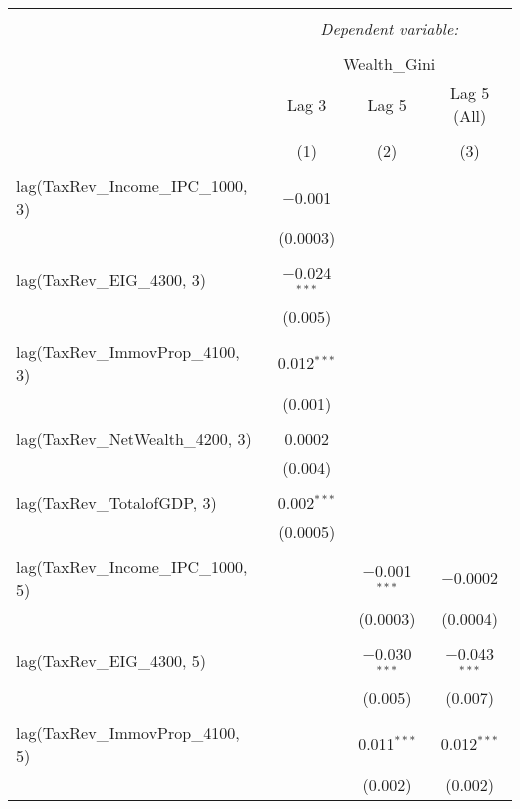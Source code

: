 
\begin{table}[!htbp] \centering 
  \caption{} 
  \label{} 
\begin{tabular}{@{\extracolsep{5pt}}lccc} 
\\[-1.8ex]\hline 
\hline \\[-1.8ex] 
 & \multicolumn{3}{c}{\textit{Dependent variable:}} \\ 
\cline{2-4} 
\\[-1.8ex] & \multicolumn{3}{c}{Wealth\_Gini} \\ 
 & Lag 3 & Lag 5 & Lag 5 (All) \\ 
\\[-1.8ex] & (1) & (2) & (3)\\ 
\hline \\[-1.8ex] 
 lag(TaxRev\_Income\_IPC\_1000, 3) & $-$0.001 &  &  \\ 
  & (0.0003) &  &  \\ 
  & & & \\ 
 lag(TaxRev\_EIG\_4300, 3) & $-$0.024$^{***}$ &  &  \\ 
  & (0.005) &  &  \\ 
  & & & \\ 
 lag(TaxRev\_ImmovProp\_4100, 3) & 0.012$^{***}$ &  &  \\ 
  & (0.001) &  &  \\ 
  & & & \\ 
 lag(TaxRev\_NetWealth\_4200, 3) & 0.0002 &  &  \\ 
  & (0.004) &  &  \\ 
  & & & \\ 
 lag(TaxRev\_TotalofGDP, 3) & 0.002$^{***}$ &  &  \\ 
  & (0.0005) &  &  \\ 
  & & & \\ 
 lag(TaxRev\_Income\_IPC\_1000, 5) &  & $-$0.001$^{***}$ & $-$0.0002 \\ 
  &  & (0.0003) & (0.0004) \\ 
  & & & \\ 
 lag(TaxRev\_EIG\_4300, 5) &  & $-$0.030$^{***}$ & $-$0.043$^{***}$ \\ 
  &  & (0.005) & (0.007) \\ 
  & & & \\ 
 lag(TaxRev\_ImmovProp\_4100, 5) &  & 0.011$^{***}$ & 0.012$^{***}$ \\ 
  &  & (0.002) & (0.002) \\ 

\end{tabular}
\end{table}
